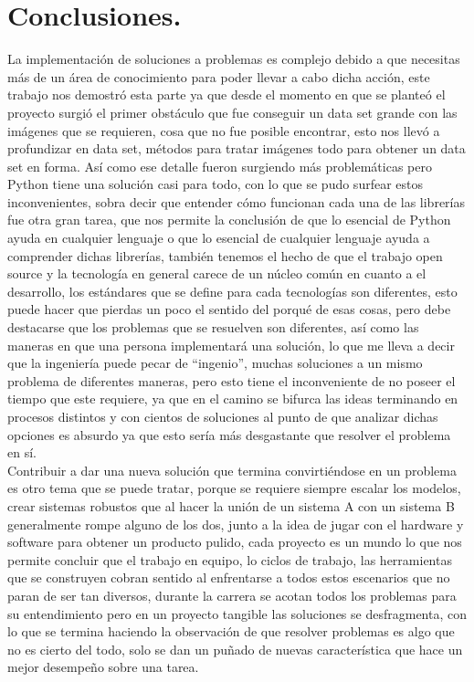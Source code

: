 \documentclass[a4paper, 12pt]{article}
\begin{document}
    \section{Conclusiones.} 
    La implementación de soluciones a problemas es complejo debido a que necesitas más de un área de conocimiento para poder llevar a cabo dicha acción, este trabajo nos demostró esta parte ya que desde el momento en que se planteó el proyecto surgió el primer obstáculo que fue conseguir un data set grande con las imágenes que se requieren, cosa que no fue posible encontrar, esto nos llevó a profundizar en data set, métodos para tratar imágenes todo para obtener un data set en forma. Así como ese detalle fueron surgiendo más problemáticas pero Python tiene una solución casi para todo, con lo que se pudo surfear estos inconvenientes, sobra decir que entender cómo funcionan cada una de las librerías fue otra gran tarea, que nos permite la conclusión de que lo esencial de Python ayuda en cualquier lenguaje o que lo esencial de cualquier lenguaje ayuda a comprender dichas librerías, también tenemos el hecho de que el trabajo open source y la tecnología en general carece de un núcleo común en cuanto a el desarrollo, los estándares que se define para cada tecnologías son diferentes, esto puede hacer que pierdas un poco el sentido del porqué de esas cosas, pero debe destacarse que los problemas que se resuelven son diferentes, así como las maneras en que una persona implementará una solución, lo que me lleva a decir que la ingeniería puede pecar de “ingenio”, muchas soluciones a un mismo problema de diferentes maneras, pero esto tiene el inconveniente de no poseer el tiempo que este requiere, ya que en el camino se bifurca las ideas terminando en procesos distintos y con cientos de soluciones al punto de que analizar dichas opciones es absurdo ya que esto sería más desgastante que resolver el problema en sí.\\ 
    Contribuir a dar una nueva solución que termina convirtiéndose en un problema es otro tema que se puede tratar, porque se requiere siempre escalar los modelos, crear sistemas robustos que al hacer la unión de un sistema A con un sistema B generalmente rompe alguno de los dos, junto a la idea de jugar con el hardware y software para obtener un producto pulido, cada proyecto es un mundo lo que nos permite concluir que el trabajo en equipo, lo ciclos de trabajo, las herramientas que se construyen cobran sentido al enfrentarse a todos estos escenarios que no paran de ser tan diversos, durante la carrera se acotan todos los problemas para su entendimiento pero en un proyecto tangible las soluciones se desfragmenta, con lo que se termina haciendo la observación de que resolver problemas es algo que no es cierto del todo, solo se dan un puñado de nuevas característica que hace un mejor desempeño sobre una tarea.  

    \clearpage

    \printbibliography 
\end{document}
